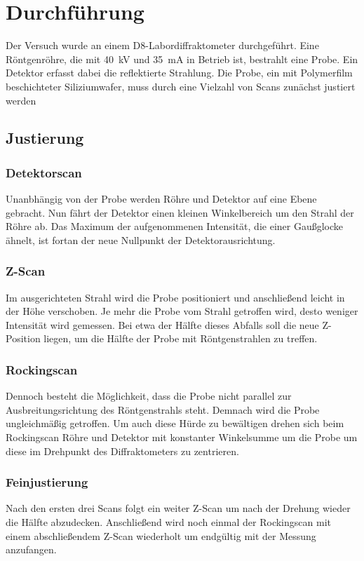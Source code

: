 \section{Durchführung}
\label{sec:Durchführung}
Der Versuch wurde an einem D8-Labordiffraktometer durchgeführt.
Eine Röntgenröhre, die mit \qty{40}{\kilo\volt} und \qty{35}{\milli\ampere} in Betrieb ist,
bestrahlt eine Probe. Ein Detektor erfasst dabei die reflektierte Strahlung.
Die Probe, ein mit Polymerfilm beschichteter Siliziumwafer, muss durch eine Vielzahl von Scans zunächst justiert werden

\subsection{Justierung}
\subsubsection*{Detektorscan}
Unanbhängig von der Probe werden Röhre und Detektor auf eine Ebene gebracht. Nun fährt der Detektor einen kleinen Winkelbereich um den Strahl der Röhre ab.
Das Maximum der aufgenommenen Intensität, die einer Gaußglocke ähnelt, ist fortan der neue Nullpunkt der Detektorausrichtung.

\subsubsection*{Z-Scan}
Im ausgerichteten Strahl wird die Probe positioniert und anschließend leicht in der Höhe verschoben. Je mehr die Probe vom Strahl getroffen wird,
desto weniger Intensität wird gemessen. Bei etwa der Hälfte dieses Abfalls soll die neue Z-Position liegen, um die Hälfte der Probe mit Röntgenstrahlen zu treffen.

\subsubsection*{Rockingscan}
Dennoch besteht die Möglichkeit, dass die Probe nicht parallel zur Ausbreitungsrichtung des Röntgenstrahls steht.
Demnach wird die Probe ungleichmäßig getroffen. Um auch diese Hürde zu bewältigen drehen sich beim Rockingscan
Röhre und Detektor mit konstanter Winkelsumme um die Probe um diese im Drehpunkt des Diffraktometers zu zentrieren.

\subsubsection*{Feinjustierung}
Nach den ersten drei Scans folgt ein weiter Z-Scan um nach der Drehung wieder die Hälfte abzudecken.
Anschließend wird noch einmal der Rockingscan mit einem abschließendem Z-Scan wiederholt um endgültig mit der Messung anzufangen.

